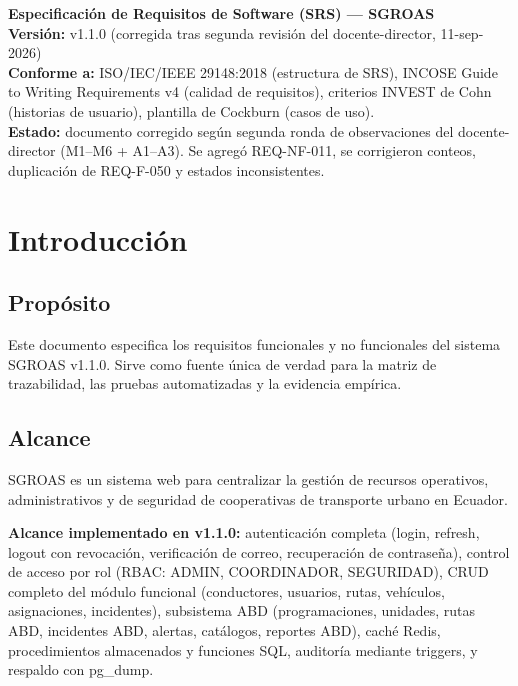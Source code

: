 \documentclass[12pt,a4paper]{article}
\begin{document}
\noindent\textbf{Especificación de Requisitos de Software (SRS) --- SGROAS}\\[0.3cm]
\noindent\textbf{Versión:} v1.1.0 (corregida tras segunda revisión del docente-director, 11-sep-2026)\\
\noindent\textbf{Conforme a:} ISO/IEC/IEEE 29148:2018 (estructura de SRS), INCOSE Guide to Writing Requirements v4 (calidad de requisitos), criterios INVEST de Cohn (historias de usuario), plantilla de Cockburn (casos de uso).\\[0.3cm]
\noindent\textbf{Estado:} documento corregido según segunda ronda de observaciones del docente-director (M1--M6 + A1--A3). Se agregó REQ-NF-011, se corrigieron conteos, duplicación de REQ-F-050 y estados inconsistentes.\\[0.3cm]

\tableofcontents
\clearpage

\section{Introducción}
\label{sec:introduccion}

\subsection{Propósito}
Este documento especifica los requisitos funcionales y no funcionales del sistema SGROAS v1.1.0. Sirve como fuente única de verdad para la matriz de trazabilidad, las pruebas automatizadas y la evidencia empírica.

\subsection{Alcance}
SGROAS es un sistema web para centralizar la gestión de recursos operativos, administrativos y de seguridad de cooperativas de transporte urbano en Ecuador.

\textbf{Alcance implementado en v1.1.0:} autenticación completa (login, refresh, logout con revocación, verificación de correo, recuperación de contraseña), control de acceso por rol (RBAC: ADMIN, COORDINADOR, SEGURIDAD), CRUD completo del módulo funcional (conductores, usuarios, rutas, vehículos, asignaciones, incidentes), subsistema ABD (programaciones, unidades, rutas ABD, incidentes ABD, alertas, catálogos, reportes ABD), caché Redis, procedimientos almacenados y funciones SQL, auditoría mediante triggers, y respaldo con pg\_dump.
\end{document}

